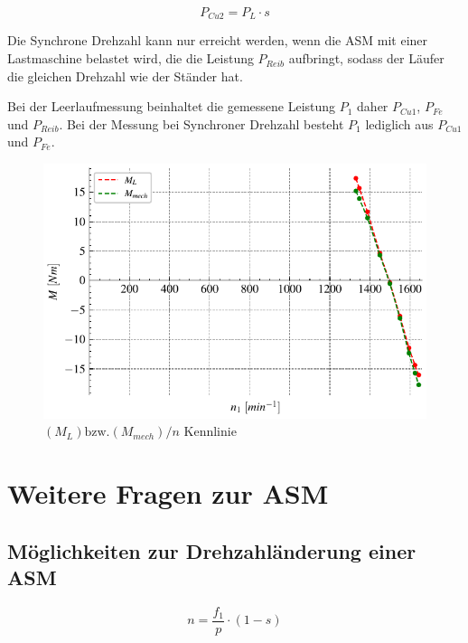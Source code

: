 \documentclass[conference]{IEEEtran}
\begin{document}
\begin{equation} \label{eq:Kupfer2_verluste}
    P_{Cu2} = P_{L} \cdot s
\end{equation}




Die Synchrone Drehzahl kann nur erreicht werden, wenn die ASM mit einer
Lastmaschine belastet wird, die die Leistung $P_{Reib}$ aufbringt, sodass der
Läufer die gleichen Drehzahl wie der Ständer hat.

Bei der Leerlaufmessung beinhaltet die gemessene Leistung $P_{1}$ daher
$P_{Cu1}$, $P_{Fe}$ und $P_{Reib}$. Bei der Messung bei Synchroner Drehzahl
besteht $P_{1}$ lediglich aus $P_{Cu1}$ und $P_{Fe}$.

\begin{figure}[htbp]
    \centering
    \includegraphics[width=\columnwidth]{./figures/moment_ueber-n_vergleichen.pdf}
    \caption{$(M_L)\text{bzw.}(M_{mech})/n$ Kennlinie}
    \label{fig:M_L-mit-M_mech-vergleichen}
\end{figure}

\newpage
\section{Weitere Fragen zur ASM}

\subsection{Möglichkeiten zur Drehzahländerung einer ASM}

\begin{equation}
    n = \frac{f_{1}}{p} \cdot (1-s)
\end{equation}
\end{document}
